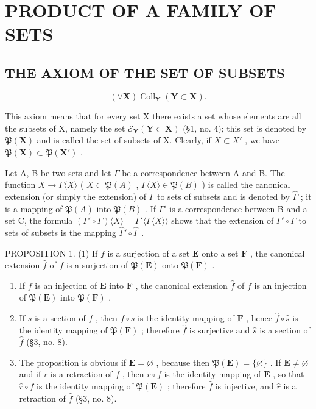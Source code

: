 \section{PRODUCT OF A FAMILY OF SETS}

\subsection{THE AXIOM OF THE SET OF SUBSETS}

\[
(\forall \mathbf {X}) \operatorname{Coll} _ {\mathbf {Y}} (\mathbf {Y} \subset \mathbf {X}).
\]

This axiom means that for every set X there exists a set whose elements are all the subsets of X, namely the set \(\mathcal{E}_{\mathbf{Y}}(\mathbf{Y}\subset\mathbf{X})\) (§1, no. 4); this set is denoted by \(\mathfrak{P}(\mathbf{X})\) and is called the set of subsets of X. Clearly, if \(X\subset X'\) , we have \(\mathfrak{P}(\mathbf{X})\subset\mathfrak{P}(\mathbf{X}')\) .

Let A, B be two sets and let \(\Gamma\) be a correspondence between A and B. The function \(X \to \Gamma\langle X\rangle\) ( \(X \subset \mathfrak{P}(A)\) , \(\Gamma\langle X\rangle \in \mathfrak{P}(B)\) ) is called the canonical extension (or simply the extension) of \(\Gamma\) to sets of subsets and is denoted by \(\hat{\Gamma}\) ; it is a mapping of \(\mathfrak{P}(A)\) into \(\mathfrak{P}(B)\) . If \(\Gamma'\) is a correspondence between B and a set C, the formula \((\Gamma' \circ \Gamma)\langle X\rangle = \Gamma'\langle\Gamma\langle X\rangle\rangle\) shows that the extension of \(\Gamma' \circ \Gamma\) to sets of subsets is the mapping \(\hat{\Gamma}' \circ \hat{\Gamma}\) .

PROPOSITION 1. (1) If \(f\) is a surjection of a set \(\mathbf{E}\) onto a set \(\mathbf{F}\) , the canonical extension \(\hat{f}\) of \(f\) is a surjection of \(\mathfrak{P}(\mathbf{E})\) onto \(\mathfrak{P}(\mathbf{F})\) .

\begin{enumerate}
\def\labelenumi{(\arabic{enumi})}
\setcounter{enumi}{1}
\item
  If \(f\) is an injection of \(\mathbf{E}\) into \(\mathbf{F}\) , the canonical extension \(\hat{f}\) of \(f\) is an injection of \(\mathfrak{P}(\mathbf{E})\) into \(\mathfrak{P}(\mathbf{F})\) .
\item
  If \(s\) is a section of \(f\) , then \(f \circ s\) is the identity mapping of \(\mathbf{F}\) , hence \(\hat{f} \circ \hat{s}\) is the identity mapping of \(\mathfrak{P}(\mathbf{F})\) ; therefore \(\hat{f}\) is surjective and \(\hat{s}\) is a section of \(\hat{f}\) (§3, no. 8).
\item
  The proposition is obvious if \(\mathbf{E} = \varnothing\) , because then \(\mathfrak{P}(\mathbf{E}) = \{\varnothing\}\) . If \(\mathbf{E} \neq \varnothing\) and if \(r\) is a retraction of \(f\) , then \(r \circ f\) is the identity mapping of \(\mathbf{E}\) , so that \(\hat{r} \circ \hat{f}\) is the identity mapping of \(\mathfrak{P}(\mathbf{E})\) ; therefore \(\hat{f}\) is injective, and \(\hat{r}\) is a retraction of \(\hat{f}\) (§3, no. 8).
\end{enumerate}

